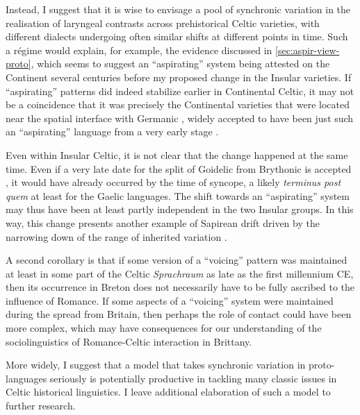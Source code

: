 \documentclass[output=paper,colorlinks,citecolor=brown]{langscibook}
\begin{document}
Instead, I suggest that it is wise to envisage a pool of synchronic variation \parencite{Ohala1989} in the realisation of laryngeal contrasts across prehistorical Celtic varieties, with different dialects undergoing often similar shifts at different points in time. Such a régime would explain, for example, the evidence discussed in \cref{sec:aspir-view-proto}, which seems to suggest an \enquote{aspirating} system being attested on the Continent several centuries before my proposed change in the Insular varieties. If  \enquote{aspirating} patterns did indeed stabilize earlier in Continental Celtic, it may not be a coincidence that it was precisely the Continental varieties that were located near the spatial interface with Germanic \parencite[for up\hyp to\hyp date discussion of Celtic\hyp Germanic relationships, see][]{sluis2023european}, widely accepted to have been just such an \enquote{aspirating} language from a very early stage \parencite{salmons2017germanic}.

Even within Insular Celtic, it is not clear that the change happened at the same time. Even if a very late date for the split of Goidelic from Brythonic is accepted \parencite[perhaps along the lines of][]{schrijver2015pruners}, it would have already occurred by the time of syncope, a likely \emph{terminus post quem} at least for the Gaelic languages. The shift towards an \enquote{aspirating} system may thus have been at least partly independent in the two Insular groups. In this way, this change presents another example of Sapirean drift driven by the narrowing down of the range of inherited variation \parencite{joseph2006germanic, iosad2020phonological}.

A second corollary is that if some version of a \enquote{voicing} pattern was maintained at least in some part of the Celtic \emph{Sprachraum} as late as the first millennium CE, then its occurrence in Breton does not necessarily have to be fully ascribed to the influence of Romance. If some aspects of a \enquote{voicing} system were maintained during the spread from Britain, then perhaps the role of contact could have been more complex, which may have consequences for our understanding of the sociolinguistics of Romance\hyp Celtic interaction in Brittany.

More widely, I suggest that a model that takes synchronic variation in proto\hyp languages seriously \parencite[cf.][]{natvig2020fully} is potentially productive in tackling many classic issues in Celtic historical linguistics. I leave additional elaboration of such a model to further research.
\end{document}

